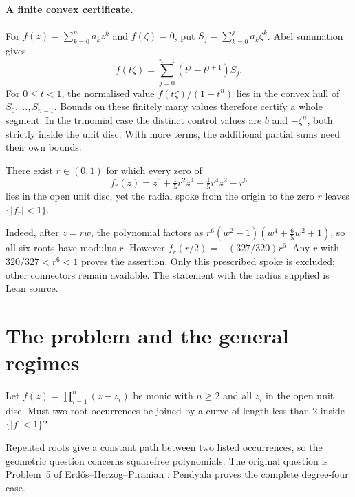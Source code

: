 \documentclass[11pt]{article}
\begin{document}
\paragraph{A finite convex certificate.}
For $f(z)=\sum_{k=0}^n a_kz^k$ and $f(\zeta)=0$, put
$S_j=\sum_{k=0}^j a_k\zeta^k$.  Abel summation gives
\[
 f(t\zeta)=\sum_{j=0}^{n-1}(t^j-t^{j+1})S_j.
\]
For $0\le t<1$, the normalised value $f(t\zeta)/(1-t^n)$ lies in the convex
hull of $S_0,\ldots,S_{n-1}$.  Bounds on these finitely many values therefore
certify a whole segment.  In the trinomial case the distinct control values
are $b$ and $-\zeta^n$, both strictly inside the unit disc.  With more terms,
the additional partial sums need their own bounds.

\begin{proposition}
\label{res:sextic-spoke}
There exist $r\in(0,1)$ for which every zero of
\[
 f_r(z)=z^6+\tfrac15 r^2 z^4-\tfrac15 r^4 z^2-r^6
\]
lies in the open unit disc, yet the radial spoke from the origin to the zero
$r$ leaves $\{|f_r|<1\}$.
\end{proposition}

Indeed, after $z=rw$, the polynomial factors as
$r^6(w^2-1)(w^4+\tfrac65 w^2+1)$, so all six roots have modulus $r$.
However $f_r(r/2)=-(327/320)r^6$.  Any $r$ with $320/327<r^6<1$ proves the
assertion.  Only this prescribed spoke is excluded; other connectors remain
available.  The statement with the radius supplied is
\href{https://github.com/wcook04/plectis-erdos/blob/f36a98bf3d3e6f65f1074e3b800e3293d5b8a51a/ErdosProblems/Erdos1041/PaperTrinomial.lean#L79}{Lean source}.

\section{The problem and the general regimes}\label{sec:problem}

\begin{problem}[Erd\H{o}s \#1041]\label{res:problem}
Let $f(z)=\prod_{i=1}^{n}(z-z_i)$ be monic with $n\ge2$ and all
$z_i$ in the open unit disc.  Must two root occurrences be joined by a curve
of length less than $2$ inside $\{|f|<1\}$?
\end{problem}

Repeated roots give a constant path between two listed occurrences, so the
geometric question concerns squarefree polynomials.  The original question
is Problem~5 of Erd\H{o}s--Herzog--Piranian \cite[p.~139]{ehp1958}.
Pendyala \cite[Thm.~1]{june2026} proves the complete degree-four case.
\end{document}
